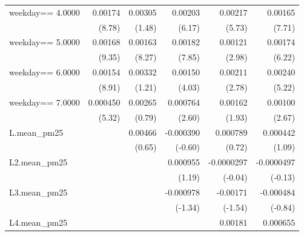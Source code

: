 \begin{table}[htbp]
\begin{tabular}{l*{5}{D{.}{.}{-1}}}
\addlinespace
weekday==     4.0000&     0.00174\sym{***}&     0.00305         &     0.00203\sym{***}&     0.00217\sym{***}&     0.00165\sym{***}\\
                    &      (8.78)         &      (1.48)         &      (6.17)         &      (5.73)         &      (7.71)         \\
\addlinespace
weekday==     5.0000&     0.00168\sym{***}&     0.00163\sym{***}&     0.00182\sym{***}&     0.00121\sym{**} &     0.00174\sym{***}\\
                    &      (9.35)         &      (8.27)         &      (7.85)         &      (2.98)         &      (6.22)         \\
\addlinespace
weekday==     6.0000&     0.00154\sym{***}&     0.00332         &     0.00150\sym{***}&     0.00211\sym{**} &     0.00240\sym{***}\\
                    &      (8.91)         &      (1.21)         &      (4.03)         &      (2.78)         &      (5.22)         \\
\addlinespace
weekday==     7.0000&    0.000450\sym{***}&     0.00265         &    0.000764\sym{**} &     0.00162         &     0.00100\sym{**} \\
                    &      (5.32)         &      (0.79)         &      (2.60)         &      (1.93)         &      (2.67)         \\
\addlinespace
L.mean\_pm25         &                     &     0.00466         &   -0.000390         &    0.000789         &    0.000442         \\
                    &                     &      (0.65)         &     (-0.60)         &      (0.72)         &      (1.09)         \\
\addlinespace
L2.mean\_pm25        &                     &                     &    0.000955         &  -0.0000297         &  -0.0000497         \\
                    &                     &                     &      (1.19)         &     (-0.04)         &     (-0.13)         \\
\addlinespace
L3.mean\_pm25        &                     &                     &   -0.000978         &    -0.00171         &   -0.000484         \\
                    &                     &                     &     (-1.34)         &     (-1.54)         &     (-0.84)         \\
\addlinespace
L4.mean\_pm25        &                     &                     &                     &     0.00181         &    0.000655         \\

\end{tabular}
\end{table}
